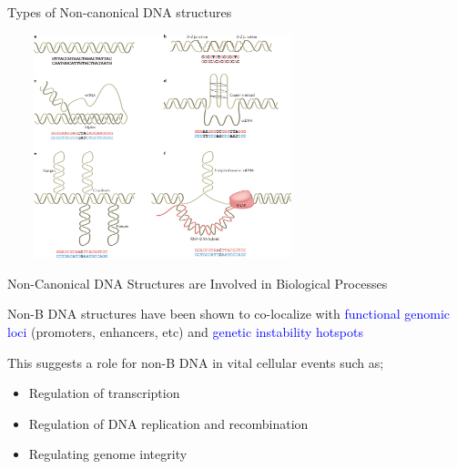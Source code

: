 \documentclass{beamer}
\begin{document}
		
		

	\begin{frame}{Types of Non-canonical DNA structures}
		
		\centering
		\includegraphics[width=9cm, height=6.5cm]{nonb_types.png}
	
	
	\end{frame}

	\begin{frame}{Non-Canonical DNA Structures are Involved in Biological Processes}
		
		Non-B DNA structures have been shown to co-localize with \textcolor{blue}{functional genomic loci} (promoters, enhancers, etc) and \textcolor{blue}{genetic instability hotspots} \newline
		
		This suggests a role for non-B DNA in vital cellular events such as;
		\begin{itemize}
			\item Regulation of transcription
			\item Regulation of DNA replication and recombination
			\item Regulating genome integrity
		\end{itemize}
	
		\centering
		
	\end{frame}
\end{document}
